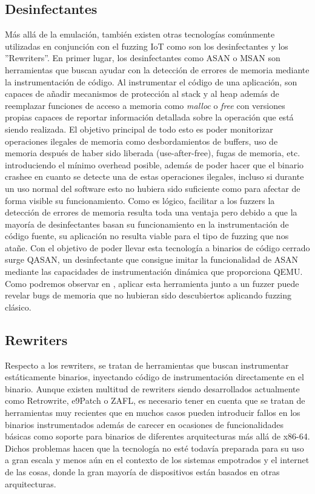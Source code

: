 \subsection{Desinfectantes}
Más allá de la emulación, también existen otras tecnologías comúnmente utilizadas en conjunción con el fuzzing IoT como son los desinfectantes y los
''Rewriters''. En primer lugar, los desinfectantes como ASAN\cite{Serebryany2012} o MSAN\cite{Stepanov2015} son herramientas que buscan ayudar con la detección de errores de memoria mediante la instrumentación 
de código. Al instrumentar el código de una aplicación, son capaces de añadir mecanismos de protección al stack y al heap además de reemplazar funciones
de acceso a memoria como \textit{malloc} o \textit{free} con versiones propias capaces de reportar información detallada sobre la operación que está siendo 
realizada. El objetivo principal de todo esto es poder monitorizar operaciones ilegales de memoria como desbordamientos de buffers, uso de memoria después de haber sido liberada (use-after-free), fugas de memoria, etc. introduciendo el mínimo overhead posible, además de poder hacer que el binario crashee en cuanto se detecte una de estas
operaciones ilegales, incluso si durante un uso normal del software esto no hubiera sido suficiente como para afectar de forma visible su funcionamiento. 
Como es lógico, facilitar a los fuzzers la detección de errores de memoria resulta toda una ventaja pero debido a que la mayoría de desinfectantes basan su
funcionamiento en la instrumentación de código fuente, su aplicación no resulta viable para el tipo de fuzzing que nos atañe. Con el objetivo de poder 
llevar esta tecnología a binarios de código cerrado surge QASAN\cite{Fioraldi2020}, un desinfectante que consigue imitar la funcionalidad de ASAN\cite{Serebryany2012} 
mediante las capacidades de instrumentación dinámica que proporciona QEMU. Como podremos observar en , aplicar esta herramienta 
junto a un fuzzer puede revelar bugs de memoria que no hubieran sido descubiertos aplicando fuzzing clásico. \bigskip

\subsection{Rewriters}
Respecto a los rewriters, se tratan de herramientas que buscan instrumentar estáticamente binarios, inyectando código de instrumentación directamente en 
el binario. Aunque existen multitud de rewriters siendo desarrollados actualmente como Retrowrite\cite{Dinesh2020}, e9Patch\cite{Duck2020} o 
ZAFL\cite{Nagy2021}, es necesario tener en cuenta que se tratan de herramientas muy recientes que en muchos casos pueden introducir fallos en los binarios
instrumentados además de carecer en ocasiones de funcionalidades básicas como soporte para binarios de diferentes arquitecturas más allá de x86-64. 
Dichos problemas hacen que la tecnología no esté todavía preparada para su uso a gran escala y menos aún en el contexto de los sistemas empotrados y el 
internet de las cosas, donde la gran mayoría de dispositivos están basados en otras arquitecturas.
\bigskip

